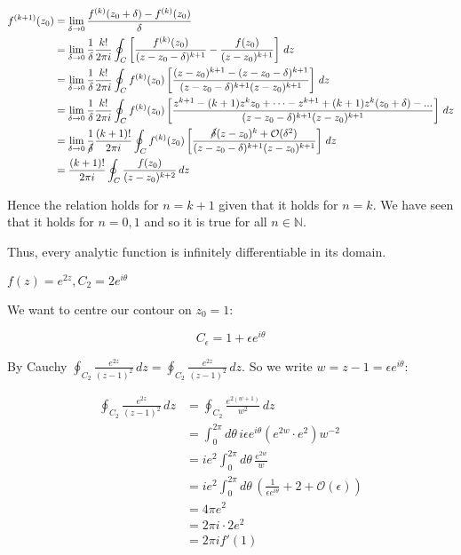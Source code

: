 \documentclass{../../physics_notes}
\begin{document}
\begin{align*}
f^{(k+1)}(z_0) &=  \lim_{\delta \to 0} \frac{f^{(k)}(z_0 + \delta) - f^{(k)}(z_0)}{\delta} \\
&= \lim_{\delta \to 0} \frac{1}{\delta} \frac{k!}{2\pi i} \oint_C \left[\frac{f^{(k)}(z_0)}{(z - z_0 - \delta)^{k+1}} - \frac{f(z_0)}{(z - z_0)^{k+1}}\right] \, dz \\
&= \lim_{\delta \to 0} \frac{1}{\delta} \frac{k!}{2\pi i} \oint_C f^{(k)}(z_0) \left[\frac{(z - z_0)^{k+1} - (z - z_0 - \delta)^{k + 1}}{(z - z_0 - \delta)^{k+1} (z-z_0)^{k+1}}\right] \, dz \\
&= \lim_{\delta \to 0} \frac{1}{\delta} \frac{k!}{2\pi i} \oint_C f^{(k)}(z_0) \left[\frac{z^{k+1} - (k+1)z^{k}z_0 + \dots - z^{k+1} + (k+1)z^{k}(z_0 + \delta) - ...}{(z - z_0 - \delta)^{k+1} (z-z_0)^{k+1}}\right] \, dz \\
&= \lim_{\delta \to 0} \frac{1}{\cancel{\delta}} \frac{(k+1)!}{2\pi i} \oint_C f^{(k)}(z_0) \left[\frac{\cancel{\delta}(z - z_0)^{k} + \mathcal{O}(\delta^2)}{(z - z_0 - \delta)^{k+1} (z-z_0)^{k+1}}\right] \, dz \\
&= \frac{(k+1)!}{2\pi i} \oint_C \frac{f(z_0)}{(z - z_0)^{k+2}} \, dz
\end{align*}

Hence the relation holds for $n = k + 1$ given that it holds for $n = k$. We have seen that it holds for $n = 0,1$ and so it is true for all $n \in \mathbb{N}$.

Thus, every analytic function is infinitely differentiable in its domain. 

\begin{example}{$f(z) = e^{2z}, C_2 = 2e^{i\theta}$}

We want to centre our contour on $z_0 = 1$:

\[ C_\epsilon = 1 + \epsilon e^{i\theta} \]

By Cauchy $\oint_{C_2} \frac{e^{2z}}{(z-1)^2} \, dz = \oint_{C_2} \frac{e^{2z}}{(z-1)^2} \, dz$. So we write $w = z - 1 = \epsilon e^{i\theta}$:

\begin{align*}
\oint_{C_2} \frac{e^{2z}}{(z-1)^2} \, dz &= \oint_{C_2} \frac{e^{2(w+1)}}{w^2} \, dz \\
&= \int_0^{2\pi} d\theta \, i\epsilon e^{i\theta} (e^{2w} \cdot e^2) w^{-2} \\
&= ie^{2} \int_{0}^{2\pi} d\theta \, \frac{e^{2w}}{w} \\
&= ie^2 \int_0^{2\pi} d\theta \, \left(\frac{1}{\epsilon e^{i\theta}} + 2 + \mathcal{O}(\epsilon)\right) \\
&= 4\pi e^2 \\
&= 2\pi i \cdot 2e^2 \\
&= 2\pi i f'(1)
\end{align*}
\end{example}
\end{document}
